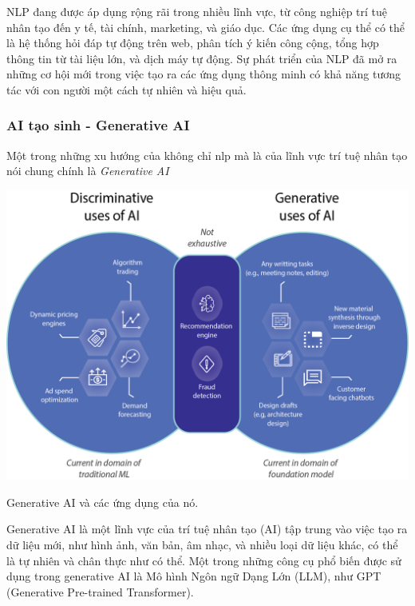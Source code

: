 \documentclass[a4paper, 12pt, openany]{book}
\begin{document}
NLP đang được áp dụng rộng rãi trong nhiều lĩnh vực, từ công nghiệp trí tuệ nhân tạo đến y tế, tài chính, marketing, và giáo dục. Các ứng dụng cụ thể có thể là hệ thống hỏi đáp tự động trên web, phân tích ý kiến công cộng, tổng hợp thông tin từ tài liệu lớn, và dịch máy tự động. Sự phát triển của NLP đã mở ra những cơ hội mới trong việc tạo ra các ứng dụng thông minh có khả năng tương tác với con người một cách tự nhiên và hiệu quả.

\subsubsection{AI tạo sinh - Generative AI}

Một trong những xu hướng của không chỉ \acl{nlp} mà là của lĩnh vực trí tuệ nhân tạo nói chung chính là \textit{Generative AI}

\vspace{0.5cm}
\begin{minipage}{\linewidth}
    \captionsetup{type=figure}
    \centering
    \includegraphics[width=\linewidth]{./assets/images/generative-ai-benefits.png}
    \caption{Generative AI và các ứng dụng của nó.}
\end{minipage}
\vspace{0.5cm}

Generative AI là một lĩnh vực của trí tuệ nhân tạo (AI) tập trung vào việc tạo ra dữ liệu mới, như hình ảnh, văn bản, âm nhạc, và nhiều loại dữ liệu khác, có thể là tự nhiên và chân thực như có thể. Một trong những công cụ phổ biến được sử dụng trong generative AI là Mô hình Ngôn ngữ Dạng Lớn (LLM), như GPT (Generative Pre-trained Transformer).
\end{document}
